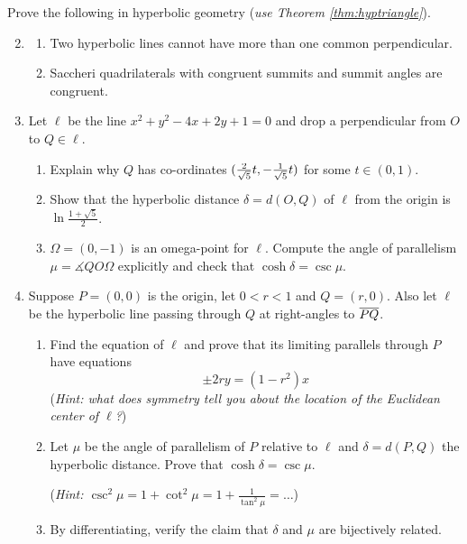 
\goodbreak


\begin{exercises}
	\exstart Prove the following in hyperbolic geometry (\emph{use Theorem \ref{thm:hyptriangle}}).\par\vspace{-2pt}
	\begin{enumerate}\setcounter{enumi}{1}
	  \item[]\begin{enumerate}
	    \item Two hyperbolic lines cannot have more than one common perpendicular.
	    \item\label{exs:saccherisummitcong} Saccheri quadrilaterals with congruent summits and summit angles are congruent.
	  \end{enumerate}
	  
	  \item Let $\ell$ be the line $x^2+y^2-4x+2y+1=0$ and drop a perpendicular from $O$ to $Q\in\ell$.
	  \begin{enumerate}
	    \item Explain why $Q$ has co-ordinates $(\smash{\frac 2{\sqrt 5}t,-\frac 1{\sqrt 5}t})$ for some $t\in(0,1)$.
	    \item Show that the hyperbolic distance $\delta=d(O,Q)$ of $\ell$ from the origin is $\ln\frac{1+\sqrt 5}2$.
	    \item $\Omega=(0,-1)$ is an omega-point for $\ell$. Compute the angle of parallelism $\mu=\measuredangle QO\Omega$ explicitly and check that $\cosh\delta=\csc\mu$.
		\end{enumerate}
		
	    
		\item\label{exs:angparallelism} 
		Suppose $P=(0,0)$ is the origin, let $0<r<1$ and $Q=(r,0)$. Also let $\ell$ be the hyperbolic line passing through $Q$ at right-angles to $\overline{PQ}$.
	  \begin{enumerate}
	    \item Find the equation of $\ell$ and prove that its limiting parallels through $P$ have equations
	    \[
	    	\pm 2ry=(1-r^2)x
	    \]
	    (\emph{Hint: what does symmetry tell you about the location of the Euclidean center of $\ell$?})
	    \item Let $\mu$ be the angle of parallelism of $P$ relative to $\ell$ and $\delta=d(P,Q)$ the hyperbolic distance. Prove that $\cosh\delta=\csc\mu$.\par
	    (\emph{Hint: $\csc^2\!\mu=1+\cot^2\!\mu=1+\frac 1{\tan^2\!\mu}=\ldots$})
	    \item By differentiating, verify the claim that $\delta$ and $\mu$ are bijectively related.
	  \end{enumerate}
	  

\end{enumerate}
\end{exercises}
